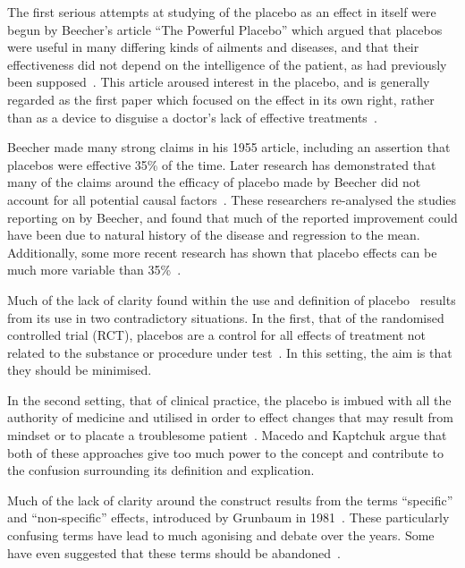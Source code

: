 The first serious attempts at studying of the placebo as an effect in itself  were begun by Beecher's article ``The Powerful Placebo'' which argued that placebos were useful in many differing kinds of ailments and diseases, and that their effectiveness did not depend on the intelligence of the patient, as had previously been supposed~\cite{beecher1955powerful}.  This article aroused interest in the placebo, and is generally regarded as the first paper which focused on the effect in its own right, rather than as a device to disguise a doctor's lack of effective treatments~\cite{beecher1955powerful,Kaptchuk1998}. 

Beecher made many strong claims in his 1955 article, including an assertion that placebos were effective 35\% of the time. Later research has demonstrated that many of the claims around the efficacy of placebo made by Beecher did not account for all potential causal factors~\cite{Kienle1998}. These researchers re-analysed the studies reporting on by Beecher, and found that much of the reported improvement could have been due to natural history of the disease and regression to the mean. Additionally, some more recent research has shown that placebo effects can be much more variable than 35\%~\cite{Turner1994}.  

Much of the lack of clarity found within the use and definition of placebo~\cite{Macedo2003,Kaptchuk1998} results from its use in two contradictory situations. In the first, that of the randomised controlled trial (RCT), placebos are a control for all effects of treatment not related to the substance or procedure under test~\cite{Vickers2000}. In this setting, the aim is that they should be minimised. 

In the second setting, that  of clinical practice, the placebo is imbued with all the authority of medicine and utilised in order to effect changes that may result from mindset or to placate a troublesome patient~\cite{Bootzin2003,Sherman2008}. Macedo and Kaptchuk argue that both of these approaches give too much power to the concept and contribute to the confusion surrounding its definition and explication. 

Much of the lack of clarity around the construct results from the terms ``specific'' and ``non-specific'' effects, introduced by Grunbaum in 1981~\cite{grunbaum1981placebo}. These particularly confusing terms have lead to much agonising and debate over the years. Some have even suggested that these terms should be abandoned~\cite{Caspi2002}. 

